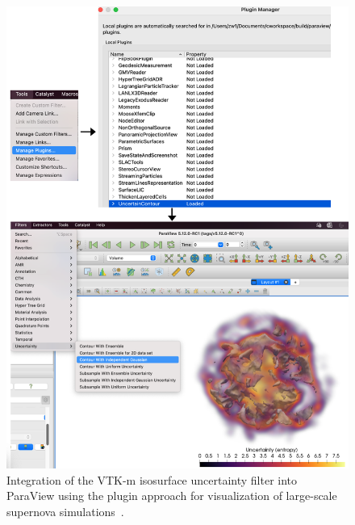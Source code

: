 \begin{figure}[htb]
  \includegraphics[width=\linewidth]{figures/isosurfaceUncertaintyPlugin.png}
  \caption{Integration of the VTK-m isosurface uncertainty filter into ParaView using the plugin approach for visualization of large-scale supernova simulations~\cite{Sandoval2021}.}
  \label{fig:uncertainty-plugin}
\end{figure}




